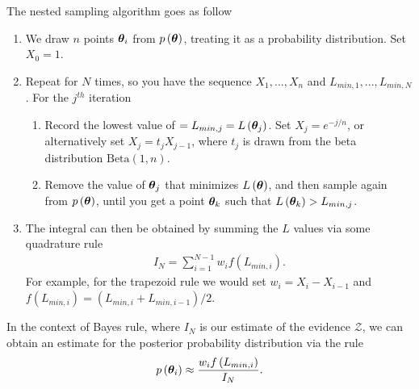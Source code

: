 The nested sampling algorithm goes as follow
\begin{enumerate}
    \item We draw $n$ points ${\bm \theta}_i$ from $p\left({\bm \theta}\right)$, treating
        it as a probability distribution. Set $X_0=1$.
    \item Repeat for $N$ times, so you have the sequence $X_1,...,X_n$ and
        $L_{min,1},...,L_{min,N}$. For the $j^{th}$ iteration
    \begin{enumerate}
        \item Record the lowest value of $=L_{min,j}=L\left({\bm \theta}_j\right)$. 
            Set $X_j = e^{-j/n}$, or alternatively set $X_j = t_j X_{j-1}$, where
            $t_j$ is drawn from the beta distribution $\mathrm{Beta}\left(1,n\right)$.
        \item Remove the value of ${\bm \theta}_j$ that minimizes $L\left({\bm \theta}\right)$,
            and then sample again from $p\left({\bm \theta}\right)$, until you get a point
            ${\bm \theta}_k$ such that $L\left({\bm \theta}_k\right)>L_{min,j}$.
    \end{enumerate}
    \item The integral can then be obtained by summing the $L$ values via some quadrature rule 
        \begin{align}
            I_N
            =
            \sum_{i=1}^{N-1} w_i f\left(L_{min,i}\right)
            .
        \end{align}
        For example, for the trapezoid rule we would set $w_i = X_{i}-X_{i-1}$ and $f\left(L_{min,i}\right)=\left(L_{min,i} + L_{min,i-1}\right)/2$.  
\end{enumerate}
In the context of Bayes rule, where $I_N$ is our estimate of the evidence $\mathcal{Z}$, we can obtain an estimate for the posterior probability distribution via the rule
\begin{align}
    p\left({\bm \theta}_i\right)
    \approx
    \frac{w_i f\left(L_{min,i}\right)}{I_N}
    .
\end{align}

